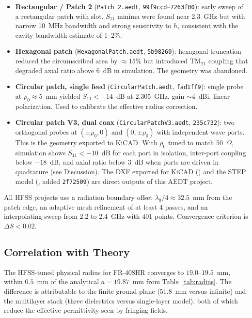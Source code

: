 \begin{itemize}[noitemsep]
    \item \textbf{Rectangular / Patch 2} (\texttt{Patch 2.aedt}, \texttt{99f9ccd}--\texttt{7263f00}): early sweep of a rectangular patch with slot. $S_{11}$ minima were found near 2.3~GHz but with narrow 10~MHz bandwidth and strong sensitivity to $h$, consistent with the cavity bandwidth estimate of 1--2\%.
    \item \textbf{Hexagonal patch} (\texttt{HexagonalPatch.aedt}, \texttt{5b98260}): hexagonal truncation reduced the circumscribed area by $\approx 15\%$ but introduced $\mathrm{TM}_{21}$ coupling that degraded axial ratio above 6~dB in simulation. The geometry was abandoned.
    \item \textbf{Circular patch, single feed} (\texttt{CircularPatch.aedt}, \texttt{fad1ff9}): single probe at $\rho_0 \approx 5$~mm yielded $S_{11} < -14$~dB at 2.305~GHz, gain $\sim 4$~dBi, linear polarization. Used to calibrate the effective radius correction.
    \item \textbf{Circular patch V3, dual coax} (\texttt{CircularPatchV3.aedt}, \texttt{235c732}): two orthogonal probes at $(\pm\rho_0,0)$ and $(0,\pm\rho_0)$ with independent wave ports. This is the geometry exported to KiCAD. With $\rho_0$ tuned to match 50~$\Omega$, simulation shows $S_{11} < -10$~dB for each port in isolation, inter-port coupling below $-18$~dB, and axial ratio below 3~dB when ports are driven in quadrature (see Discussion). The DXF exported for KiCAD () and the STEP model (, added \texttt{2f72509}) are direct outputs of this AEDT project.
\end{itemize}

All HFSS projects use a radiation boundary offset $\lambda_0/4 \approx 32.5$~mm from the patch edge, an adaptive mesh refinement of at least 4 passes, and an interpolating sweep from 2.2 to 2.4~GHz with 401 points. Convergence criterion is $\Delta S < 0.02$.

\subsection{Correlation with Theory}

The HFSS-tuned physical radius for FR-408HR converges to $19.0$--$19.5$~mm, within $0.5$~mm of the analytical $a=19.87$~mm from Table~\ref{tab:radius}. The difference is attributable to the finite ground plane ($51.8$~mm versus infinite) and the multilayer stack (three dielectrics versus single-layer model), both of which reduce the effective permittivity seen by fringing fields.

